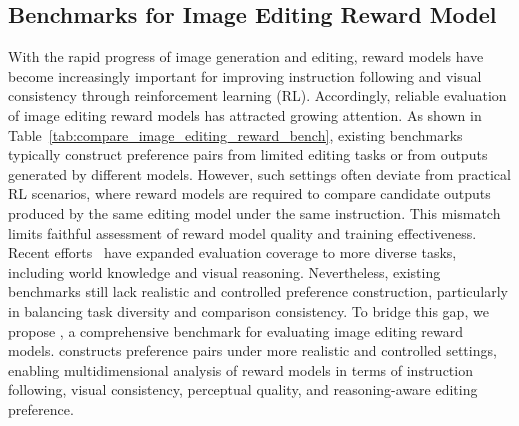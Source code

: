 \subsection{Benchmarks for Image Editing Reward Model}



With the rapid progress of image generation and editing, reward models have become increasingly important for improving instruction following and visual consistency through reinforcement learning (RL). Accordingly, reliable evaluation of image editing reward models has attracted growing attention.
As shown in Table~\ref{tab:compare_image_editing_reward_bench}, existing benchmarks~\cite{luo2025editscore,wu2025editreward,hu2025multimodal} typically construct preference pairs from limited editing tasks or from outputs generated by different models. However, such settings often deviate from practical RL scenarios, where reward models are required to compare candidate outputs produced by the same editing model under the same instruction. This mismatch limits faithful assessment of reward model quality and training effectiveness.
Recent efforts~\cite{zhao2025envisioning,deng2025emerging} have expanded evaluation coverage to more diverse tasks, including world knowledge and visual reasoning. Nevertheless, existing benchmarks still lack realistic and controlled preference construction, particularly in balancing task diversity and comparison consistency.
To bridge this gap, we propose \textbf{{\rmbench}}, a comprehensive benchmark for evaluating image editing reward models. {\rmbench} constructs preference pairs under more realistic and controlled settings, enabling multidimensional analysis of reward models in terms of instruction following, visual consistency, perceptual quality, and reasoning-aware editing preference.


 
